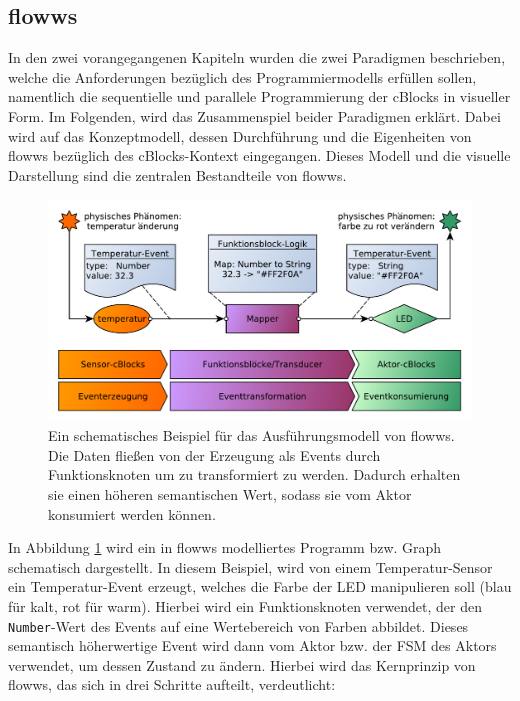 \subsection{flowws}
In den zwei vorangegangenen Kapiteln wurden die zwei Paradigmen beschrieben, welche die Anforderungen bezüglich des Programmiermodells erfüllen sollen, namentlich die sequentielle und parallele Programmierung der cBlocks in visueller Form. Im Folgenden, wird das Zusammenspiel beider Paradigmen erklärt. Dabei wird auf das Konzeptmodell, dessen Durchführung und die Eigenheiten von flowws bezüglich des cBlocks-Kontext eingegangen. Dieses Modell und die visuelle Darstellung sind die zentralen Bestandteile von flowws.

\begin{figure}[h]
  \centering
  \includegraphics[width=1\textwidth]{bilder/chapter4/chapter4_2/flowwsschematicexample.pdf}
  \caption{Ein schematisches Beispiel für das Ausführungsmodell von flowws. Die Daten fließen von der Erzeugung als Events durch Funktionsknoten um zu transformiert zu werden. Dadurch erhalten sie einen höheren semantischen Wert, sodass sie vom Aktor konsumiert werden können.}
  \label{fig:beispielflowws}
\end{figure}

In Abbildung \ref{fig:beispielflowws} wird ein in flowws modelliertes Programm bzw. Graph schematisch dargestellt.  In diesem Beispiel, wird von einem Temperatur-Sensor ein Temperatur-Event erzeugt, welches die Farbe der LED manipulieren soll (blau für kalt, rot für warm). Hierbei wird ein Funktionsknoten verwendet, der den \texttt{Number}-Wert des Events auf eine Wertebereich von Farben abbildet. Dieses semantisch höherwertige Event wird dann vom Aktor bzw. der \ac{FSM} des Aktors verwendet, um dessen Zustand zu ändern. Hierbei wird das Kernprinzip von flowws, das sich in drei Schritte aufteilt, verdeutlicht:

